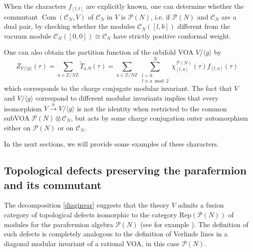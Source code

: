 \documentclass[11pt,reqno]{article}
\newcommand{\be}{\begin{equation}}
\newcommand{\ee}{\end{equation}}
\newcommand{\calC}{\mathcal{C}}
\DeclareMathOperator{\Com}{Com}
\newcommand{\ZZ}{\mathbb{Z}}
\newcommand{\paraf}{\mathcal{P}}
\begin{document}
When the characters $f_{[l,t]}$ are explicitly known, one can determine whether the commutant $\Com(\calC_N,V)$ of $\calC_N$ in $V$ is $\paraf(N)$, i.e. if $\paraf(N)$ and $\calC_N$ are a dual pair, by checking whether the modules $\calC_N([l,b])$ different from the vacuum module $\calC_N([0,0])\cong \calC_N$ have strictly positive conformal weight. 

One can also obtain the partition function of the orbifold VOA $V/\langle g\rangle$ by
\be Z_{V/\langle g\rangle}(\tau)=\sum_{a\in \ZZ/N\ZZ} \tilde T_{a,0}(\tau)=\sum_{a\in \ZZ/N\ZZ} \sum_{\substack{l=0\\l\equiv a\bmod{2}}}^N \chi^{\paraf(N)}_{[l,a]}(\tau)f_{[l,a]}(\tau)
\ee which corresponds to the charge conjugate modular invariant. The fact that $V$ and $V/\langle g\rangle$ correspond to different modular invariants implies that every isomorphism $V\stackrel{\cong}{\longrightarrow} V/\langle g\rangle$ is not the identity when restricted to the common subVOA $\paraf(N)\otimes \calC_N$, but acts by some charge conjugation outer automorphism either on $\paraf(N)$ or on $\calC_N$.

In the next sections, we will provide some examples of these characters.



\subsection{Topological defects preserving the parafermion and its commutant}\label{s:topdefparaf}

The decomposition \eqref{diaginvar} suggests that the theory $V$ admits a fusion category of topological defects isomorphic to the category $\mathrm{Rep}(\paraf(N))$ of modules for the parafermion algebra $\paraf(N)$ (see for example \cite{Haghighat:2023sax}). The definition of such defects is completely analogous to the definition of Verlinde lines in a diagonal modular invariant of a rational VOA, in this case $\paraf(N)$. 
\end{document}
